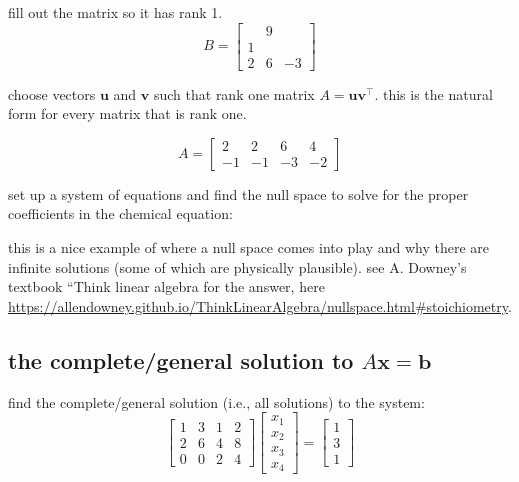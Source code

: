 \documentclass[addpoints]{exam}
\begin{document}
\begin{questions}
\question fill out the matrix so it has rank 1.
\begin{equation*}
	B=\begin{bmatrix} & 9 & \\1 && \\ 2 &6& -3 \end{bmatrix}
\end{equation*}

\question choose vectors $\mathbf{u}$ and $\mathbf{v}$ such that rank one matrix $A=\mathbf{u}\mathbf{v}^\intercal$. this is the natural form for every matrix that is rank one.

\begin{equation*}
	A=\begin{bmatrix} 2&2&6&4\\ -1&-1&-3&-2 \end{bmatrix}
\end{equation*}

\question set up a system of equations and find the null space to solve for the proper coefficients in the chemical equation:


this is a nice example of where a null space comes into play and why there are infinite solutions (some of which are physically plausible). see A. Downey's textbook ``Think linear algebra for the answer, here \url{https://allendowney.github.io/ThinkLinearAlgebra/nullspace.html#stoichiometry}.

\subsection*{the complete/general solution to $A\mathbf{x}=\mathbf{b}$}
\question find the complete/general solution (i.e., all solutions) to the system:
\begin{equation*}
        \begin{bmatrix} 1&3&1&2\\ 2&6&4&8 \\0&0&2&4 \end{bmatrix}
	\begin{bmatrix} x_1\\x_2\\x_3\\x_4 \end{bmatrix}=
	\begin{bmatrix} 1\\3\\1 \end{bmatrix}
\end{equation*}


\end{questions}
\end{document}
